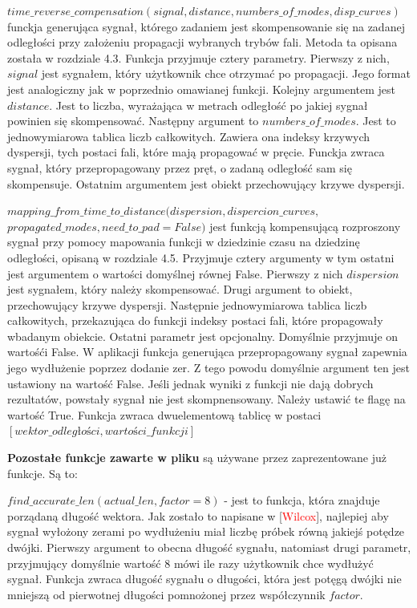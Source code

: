 $time\_reverse\_compensation(signal, distance, numbers\_of\_modes, disp\_curves)$ funckja generująca sygnał, którego zadaniem jest skompensowanie się na zadanej odległości przy założeniu propagacji wybranych trybów fali. Metoda ta opisana została w rozdziale 4.3. Funkcja przyjmuje cztery parametry. Pierwszy z nich, $signal$ jest sygnałem, który użytkownik chce otrzymać po propagacji. Jego format jest analogiczny jak w poprzednio omawianej funkcji. Kolejny argumentem jest $distance$. Jest to liczba, wyrażająca w metrach odległość po jakiej sygnał powinien się skompensować. Następny argument to $numbers\_of\_modes$. Jest to jednowymiarowa tablica liczb całkowitych. Zawiera ona indeksy krzywych dyspersji, tych postaci fali, które mają propagować w pręcie. Funckja zwraca sygnał, który przepropagowany przez pręt, o zadaną odległość sam się skompensuje. Ostatnim argumentem jest obiekt przechowujący krzywe dyspersji.

$mapping\_from\_time\_to\_distance(dispersion, dispercion\_curves,$
$ propagated\_modes, need\_to\_pad = False)$ jest funkcją kompensującą rozproszony sygnał przy pomocy mapowania funkcji w dziedzinie czasu na dziedzinę odległości, opisaną w rozdziale 4.5. Przyjmuje cztery argumenty w tym ostatni jest argumentem o wartości domyślnej równej False. Pierwszy z nich $dispersion$ jest sygnałem, który należy skompensować. Drugi argument to obiekt, przechowujący krzywe dyspersji. Następnie jednowymiarowa tablica liczb całkowitych, przekazująca do funkcji indeksy postaci fali, które propagowały  wbadanym obiekcie. Ostatni parametr jest opcjonalny. Domyślnie przyjmuje on wartośći False. W aplikacji funkcja generująca przepropagowany sygnał zapewnia jego wydłużenie poprzez dodanie zer. Z tego powodu domyślnie argument ten jest ustawiony na wartość False. Jeśli jednak wyniki z funkcji nie dają dobrych rezultatów, powstały sygnał nie jest skompnensowany. Należy ustawić te flagę na wartość True. Funkcja zwraca dwuelementową tablicę w postaci $[wektor\_odległości, wartości\_funkcji]$

\textbf{Pozostałe funkcje zawarte w pliku} są używane przez zaprezentowane już funkcje. Są to:

$find\_accurate\_len(actual\_len, factor=8)$ - jest to funkcja, która znajduje porządaną długość wektora. Jak zostało to napisane w [\textcolor{red}{Wilcox}], najlepiej aby sygnał wyłożony zerami po wydłużeniu miał liczbę próbek równą jakiejś potędze dwójki. Pierwszy argument to obecna długość sygnału, natomiast drugi parametr, przyjmujący domyślnie wartość 8 mówi ile razy użytkownik chce wydłużyć sygnał. Funkcja zwraca długość sygnału o długości, która jest potęgą dwójki nie mniejszą od pierwotnej długości pomnożonej przez współczynnik $factor$.

